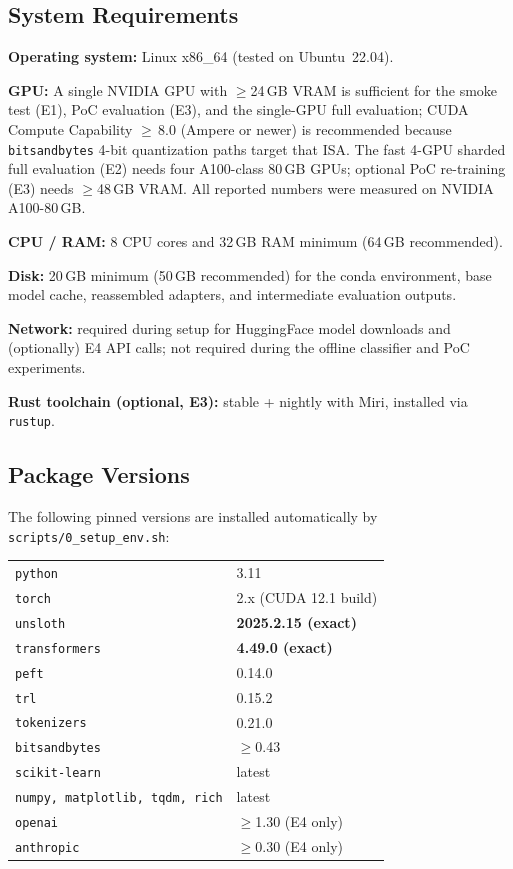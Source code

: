 \documentclass[nonacm,sigconf]{acmart}
\begin{document}
\subsection{System Requirements}

\textbf{Operating system:} Linux x86\_64 (tested on Ubuntu~22.04).

\noindent\textbf{GPU:} A single NVIDIA GPU with $\geq$24\,GB VRAM is
sufficient for the smoke test (E1), PoC evaluation (E3), and the
single-GPU full evaluation; CUDA Compute Capability $\geq$\,8.0
(Ampere or newer) is recommended because \texttt{bitsandbytes} 4-bit
quantization paths target that ISA.
The fast 4-GPU sharded full evaluation (E2) needs four A100-class
80\,GB GPUs; optional PoC re-training (E3) needs $\geq$48\,GB VRAM.
All reported numbers were measured on NVIDIA A100-80\,GB.

\noindent\textbf{CPU / RAM:} 8 CPU cores and 32\,GB RAM minimum
(64\,GB recommended).

\noindent\textbf{Disk:} 20\,GB minimum (50\,GB recommended) for the
conda environment, base model cache, reassembled adapters, and
intermediate evaluation outputs.

\noindent\textbf{Network:} required during setup for HuggingFace
model downloads and (optionally) E4 API calls; not required during
the offline classifier and PoC experiments.

\noindent\textbf{Rust toolchain (optional, E3):} stable + nightly with
Miri, installed via \texttt{rustup}.


\subsection{Package Versions}

The following pinned versions are installed automatically by
\texttt{scripts/0\_setup\_env.sh}:

\medskip
\begin{tabular}{ll}
\texttt{python}        & 3.11 \\
\texttt{torch}         & 2.x (CUDA 12.1 build) \\
\texttt{unsloth}       & \textbf{2025.2.15 (exact)} \\
\texttt{transformers}  & \textbf{4.49.0 (exact)} \\
\texttt{peft}          & 0.14.0 \\
\texttt{trl}           & 0.15.2 \\
\texttt{tokenizers}    & 0.21.0 \\
\texttt{bitsandbytes}  & $\geq$0.43 \\
\texttt{scikit-learn}  & latest \\
\texttt{numpy, matplotlib, tqdm, rich} & latest \\
\texttt{openai}        & $\geq$1.30 (E4 only) \\
\texttt{anthropic}     & $\geq$0.30 (E4 only) \\
\end{tabular}
\end{document}

